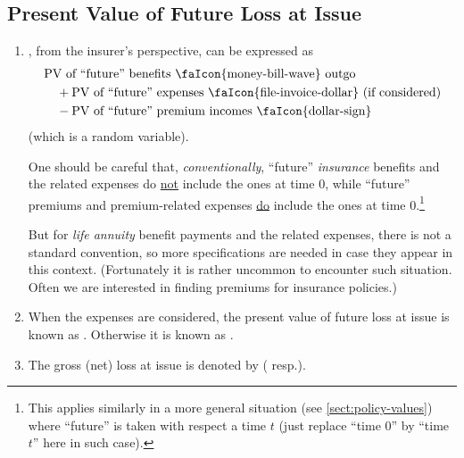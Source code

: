 \subsection{Present Value of Future Loss at Issue}
\begin{enumerate}
\item {}, from the insurer's 
perspective, can be expressed as
\begin{align*}
&\text{PV of ``future'' benefits \faIcon{money-bill-wave} outgo} \\
&\quad+ \text{PV of ``future'' expenses \faIcon{file-invoice-dollar} (if considered)}\\
&\quad- \text{PV of ``future'' premium incomes \faIcon{dollar-sign}}
\end{align*}
(which is a random variable).

\begin{warning}
One should be careful that, \emph{conventionally}, ``future'' \emph{insurance}
benefits and the related expenses do \underline{not} include the ones at time
0, while ``future'' premiums and premium-related expenses \underline{do}
include the ones at time 0.\footnote{This applies similarly in a more general
situation (see \cref{sect:policy-values}) where ``future'' is taken with
respect a time \(t\) (just replace ``time 0'' by ``time \(t\)'' here in such
case).}

But for \emph{life annuity} benefit payments and the related expenses,
there is not a standard convention, so more specifications are needed in case
they appear in this context.  (Fortunately it is rather uncommon to encounter
such situation. Often we are interested in finding premiums for insurance
policies.)
\end{warning}

\item When the expenses  are considered, the
present value of future loss at issue is known as .
Otherwise it is known as .
\item The gross (net) loss at issue is denoted by 
( resp.).



\end{enumerate}
